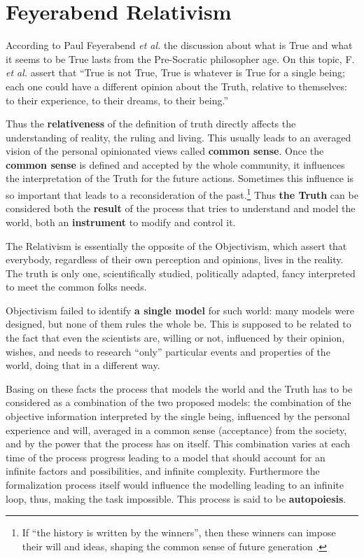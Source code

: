 \section{Feyerabend Relativism}

According to Paul Feyerabend \textit{\textit{et al.}} \cite{PF} the discussion about what is True
and what it seems to be True lasts from the Pre-Socratic philosopher age.
On this topic, F. \textit{\textit{et al.}} assert that ``True is not True, True is whatever is True for
a single being; each one could have a different opinion about the Truth, relative
to themselves: to their experience, to their dreams, to their being.''

Thus the \textbf{relativeness} of the definition of truth directly affects the
understanding of reality, the ruling and living. This usually  leads to
an averaged vision of the personal opinionated views called \textbf{common sense}.
Once the \textbf{common sense} is defined and accepted by the whole community,
it influences the interpretation of the Truth for the future actions.
Sometimes this influence is so important that leads to a reconsideration of the
past.\footnote{If ``the history is written by the winners'', then these winners can impose their will and ideas, shaping the common sense of future generation
.}
Thus \textbf{the Truth} can be considered both the \textbf{result} of the
process that tries to understand and model the world, both an
\textbf{instrument} to modify and control it.

The Relativism is essentially the opposite of the Objectivism, which assert that
everybody, regardless of their own perception and opinions, lives in the reality.
The truth is only one, scientifically studied, politically adapted, fancy
interpreted to meet the common folks needs.\cite{PF}

Objectivism failed to identify \textbf{a single model} for such world: many models were designed, but none of them rules the whole be.
This is supposed to be related to the fact that even the scientists are, willing
or not, influenced by their opinion, wishes, and needs to research ``only'' particular events and properties of the world, doing that in a different way.

Basing on these facts the process that models the world and the Truth has to be considered as
a combination of the two proposed models: the combination of the objective
information interpreted by the single being, influenced by the personal
experience and will, averaged in a common sense (acceptance) from the society,
and by the power that the process has on itself.
This combination varies at each time of the process progress leading to
a model that should account for an infinite factors and possibilities,
and infinite complexity. Furthermore  the formalization process itself would influence
the modelling leading to an infinite loop, thus, making the task impossible.
This process is said to be \textbf{autopoiesis}.

